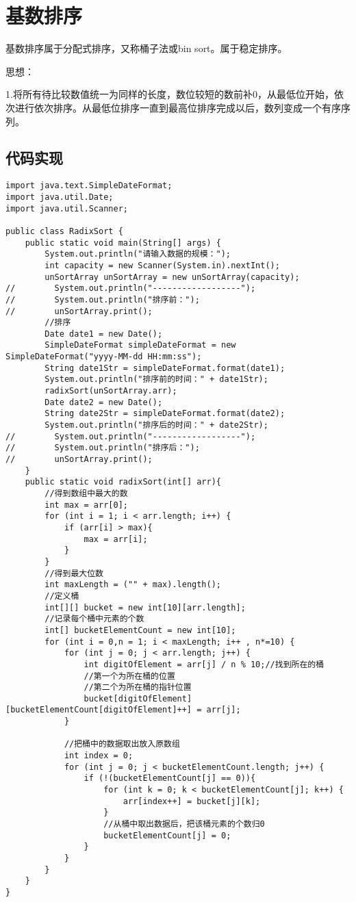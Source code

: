 \documentclass[a4paper]{report}
\begin{document}
\section{基数排序}
基数排序属于分配式排序，又称桶子法或bin sort。属于稳定排序。

思想：

1.将所有待比较数值统一为同样的长度，数位较短的数前补0，从最低位开始，依次进行依次排序。从最低位排序一直到最高位排序完成以后，数列变成一个有序序列。
\subsection{代码实现}
\begin{lstlisting}
import java.text.SimpleDateFormat;
import java.util.Date;
import java.util.Scanner;

public class RadixSort {
    public static void main(String[] args) {
        System.out.println("请输入数据的规模：");
        int capacity = new Scanner(System.in).nextInt();
        unSortArray unSortArray = new unSortArray(capacity);
//        System.out.println("------------------");
//        System.out.println("排序前：");
//        unSortArray.print();
        //排序
        Date date1 = new Date();
        SimpleDateFormat simpleDateFormat = new SimpleDateFormat("yyyy-MM-dd HH:mm:ss");
        String date1Str = simpleDateFormat.format(date1);
        System.out.println("排序前的时间：" + date1Str);
        radixSort(unSortArray.arr);
        Date date2 = new Date();
        String date2Str = simpleDateFormat.format(date2);
        System.out.println("排序后的时间：" + date2Str);
//        System.out.println("------------------");
//        System.out.println("排序后：");
//        unSortArray.print();
    }
    public static void radixSort(int[] arr){
        //得到数组中最大的数
        int max = arr[0];
        for (int i = 1; i < arr.length; i++) {
            if (arr[i] > max){
                max = arr[i];
            }
        }
        //得到最大位数
        int maxLength = ("" + max).length();
        //定义桶
        int[][] bucket = new int[10][arr.length];
        //记录每个桶中元素的个数
        int[] bucketElementCount = new int[10];
        for (int i = 0,n = 1; i < maxLength; i++ , n*=10) {
            for (int j = 0; j < arr.length; j++) {
                int digitOfElement = arr[j] / n % 10;//找到所在的桶
                //第一个为所在桶的位置
                //第二个为所在桶的指针位置
                bucket[digitOfElement][bucketElementCount[digitOfElement]++] = arr[j];
            }

            //把桶中的数据取出放入原数组
            int index = 0;
            for (int j = 0; j < bucketElementCount.length; j++) {
                if (!(bucketElementCount[j] == 0)){
                    for (int k = 0; k < bucketElementCount[j]; k++) {
                        arr[index++] = bucket[j][k];
                    }
                    //从桶中取出数据后，把该桶元素的个数归0
                    bucketElementCount[j] = 0;
                }
            }
        }
    }
}
\end{lstlisting}
\end{document}
